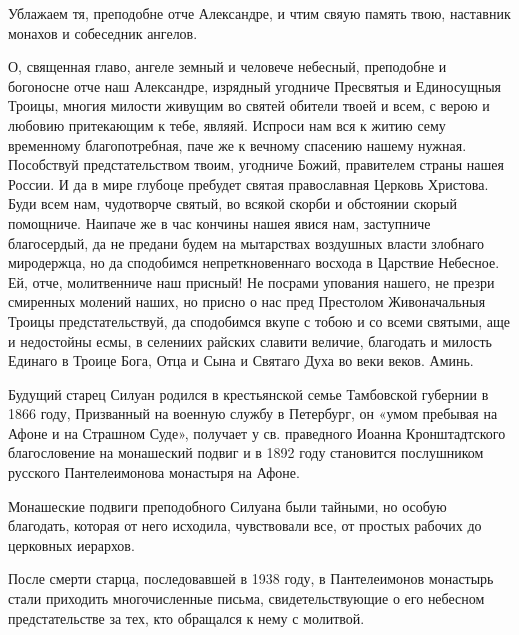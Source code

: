 

Ублажаем тя, преподобне отче Александре, и чтим свяую память твою, наставник монахов и собеседник ангелов.




О, священная главо, ангеле земный и человече небесный, преподобне и богоносне отче наш Александре, изрядный угодниче Пресвятыя и Единосущныя Троицы, многия милости живущим во святей обители твоей и всем, с верою и любовию притекающим к тебе, являяй. Испроси нам вся к житию сему временному благопотребная, паче же к вечному спасению нашему нужная. Пособствуй предстательством твоим, угодниче Божий, правителем страны нашея России. И да в мире глубоце пребудет святая православная Церковь Христова. Буди всем нам, чудотворче святый, во всякой скорби и обстоянии скорый помощниче. Наипаче же в час кончины нашея явися нам, заступниче благосердый, да не предани будем на мытарствах воздушных власти злобнаго миродержца, но да сподобимся непреткновеннаго восхода в Царствие Небесное. Ей, отче, молитвенниче наш присный! Не посрами упования нашего, не презри смиренных молений наших, но присно о нас пред Престолом Живоначальныя Троицы предстательствуй, да сподобимся вкупе с тобою и со всеми святыми, аще и недостойны есмы, в селениих райских славити величие, благодать и милость Единаго в Троице Бога, Отца и Сына и Святаго Духа во веки веков. Аминь.\mychapterending

 
Будущий старец Силуан родился в крестьянской семье Тамбовской губернии в 1866 году, Призванный на военную службу в Петербург, он «умом пребывая на Афоне и на Страшном Суде», получает у св. праведного Иоанна Кронштадтского благословение на монашеский подвиг и в 1892 году становится послушником русского Пантелеимонова монастыря на Афоне. 


Монашеские подвиги преподобного Силуана были тайными, но особую благодать, которая от него исходила, чувствовали все, от простых рабочих до церковных иерархов. 


После смерти старца, последовавшей в 1938 году, в Пантелеимонов монастырь стали приходить многочисленные письма, свидетельствующие о его небесном предстательстве за тех, кто обращался к нему с молитвой.





